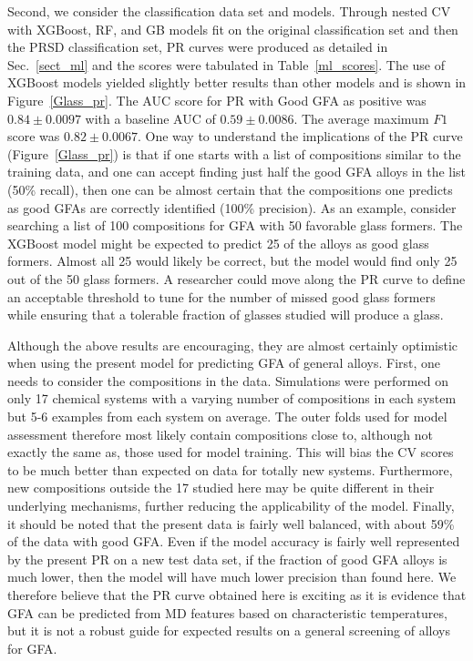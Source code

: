 \documentclass[11pt,a4paper]{article}                                %
\begin{document}
\par
Second, we consider the classification data set and models. Through nested CV with XGBoost, RF, and GB models fit on the original classification set and then the PRSD classification set, PR curves were produced as detailed in Sec.~\ref{sect_ml} and the scores were tabulated in Table~\ref{ml_scores}. The use of XGBoost models yielded slightly better results than other models and is shown in Figure~\ref{Glass_pr}. The AUC score for PR with Good GFA as positive was $0.84 \pm 0.0097$ with a baseline AUC of $0.59 \pm 0.0086$. The average maximum $F1$ score was $0.82 \pm 0.0067$. One way to understand the implications of the PR curve (Figure~\ref{Glass_pr}) is that if one starts with a list of compositions similar to the training data, and one can accept finding just half the good GFA alloys in the list (50\% recall), then one can be almost certain that the compositions one predicts as good GFAs are correctly identified (100\% precision). As an example, consider searching a list of 100 compositions for GFA with 50 favorable glass formers. The XGBoost model might be expected to predict 25 of the alloys as good glass formers. Almost all 25 would likely be correct, but the model would find only 25 out of the 50 glass formers. A researcher could move along the PR curve to define an acceptable threshold to tune for the number of missed good glass formers while ensuring that a tolerable fraction of glasses studied will produce a glass.

\par
Although the above results are encouraging, they are almost certainly optimistic when using the present model for predicting GFA of general alloys. First, one needs to consider the compositions in the data. Simulations were performed on only 17 chemical systems with a varying number of compositions in each system but 5-6 examples from each system on average. The outer folds used for model assessment therefore most likely contain compositions close to, although not exactly the same as, those used for model training. This will bias the CV scores to be much better than expected on data for totally new systems. Furthermore, new compositions outside the 17 studied here may be quite different in their underlying mechanisms, further reducing the applicability of the model. Finally, it should be noted that the present data is fairly well balanced, with about 59\% of the data with good GFA. Even if the model accuracy is fairly well represented by the present PR on a new test data set, if the fraction of good GFA alloys is much lower, then the model will have much lower precision than found here. We therefore believe that the PR curve obtained here is exciting as it is evidence that GFA can be predicted from MD features based on characteristic temperatures, but it is not a robust guide for expected results on a general screening of alloys for GFA.
\end{document}

